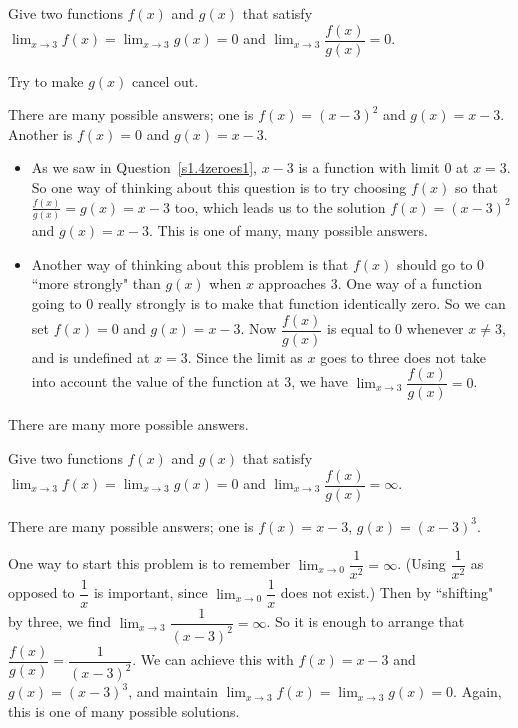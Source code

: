 \begin{Mquestion}\label{s1.4zeroes2}
Give two functions $f(x)$ and $g(x)$ that satisfy $\displaystyle\lim_{x \rightarrow 3}f(x)=\displaystyle\lim_{x \rightarrow 3}g(x)=0$ and $\displaystyle\lim_{x \rightarrow 3} \dfrac{f(x)}{g(x)}=0$.
\end{Mquestion}
\begin{hint} Try to make $g(x)$  cancel out.
\end{hint}
\begin{answer} There are many possible answers; one is
$f(x)=(x-3)^2$ and $g(x)=x-3$. Another is $f(x)=0$ and $g(x)=x-3$.
\end{answer}
\begin{solution}
\begin{itemize}
\item As we saw in Question~\ref{s1.4zeroes1}, $x-3$ is a function with limit 0 at $x=3$.  So one way of thinking about this question is to try choosing $f(x)$ so that  $\frac{f(x)}{g(x)}=g(x)=x-3$ too, which leads us to the solution $f(x)=(x-3)^2$ and $g(x)=x-3$. This is one of many, many possible answers.

\item Another way of thinking about this problem is that $f(x)$ should go to 0 ``more strongly" than $g(x)$ when $x$ approaches $3$. One way of a function going to 0 really strongly is to make that function identically zero. So we can set $f(x)=0$ and $g(x)=x-3$. Now $\dfrac{f(x)}{g(x)}$ is equal to 0 whenever $x \neq 3$, and is undefined at $x=3$. Since the limit as $x$ goes to three does not take into account the value of the function at 3, we have $\displaystyle\lim_{x \rightarrow 3} \dfrac{f(x)}{g(x)}=0$.
\end{itemize}
There are many more possible answers.
\end{solution}

\begin{question}\label{s1.4zeroes3}
Give two functions $f(x)$ and $g(x)$ that satisfy $\displaystyle\lim_{x \rightarrow 3}f(x)=\displaystyle\lim_{x \rightarrow 3}g(x)=0$ and $\displaystyle\lim_{x \rightarrow 3} \dfrac{f(x)}{g(x)}=\infty$.
\end{question}
\begin{answer}There are many possible answers; one is
$f(x)=x-3$, $g(x)=(x-3)^3$.
\end{answer}
\begin{solution} One way to start this problem is to remember $\displaystyle \lim_{x \rightarrow 0} \dfrac{1}{x^2}=\infty$. (Using $\dfrac{1}{x^2}$ as opposed to $\dfrac{1}{x}$ is important, since $\displaystyle\lim_{x \rightarrow 0}\dfrac{1}{x}$ does not exist.) Then by ``shifting" by three, we find $\displaystyle \lim_{x \rightarrow 3} \dfrac{1}{(x-3)^2}=\infty$. So it is enough to arrange that $\dfrac{f(x)}{g(x)}=\dfrac{1}{(x-3)^2}$. We can achieve this with $f(x)=x-3$ and $g(x)=(x-3)^3$, and maintain $\displaystyle\lim_{x \rightarrow 3}f(x)=\displaystyle\lim_{x \rightarrow 3}g(x)=0$. Again, this is one of many possible solutions.
\end{solution}

